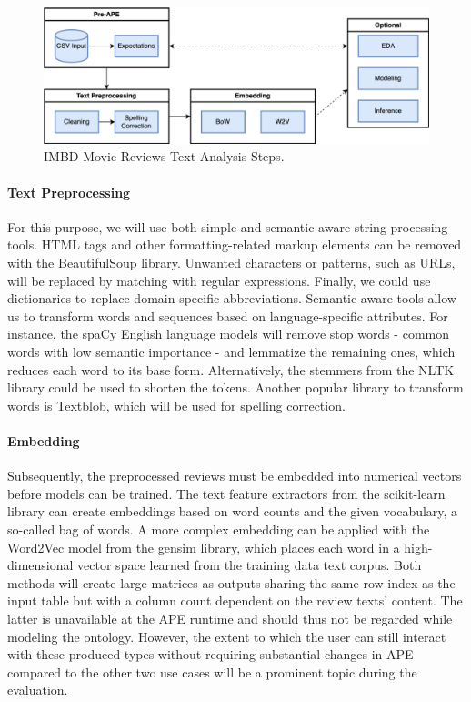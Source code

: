 \begin{figure}
    \centering
    \includegraphics[width=\linewidth]{Tex/images/IMBD.png}
    \caption{IMBD Movie Reviews Text Analysis Steps.}
    \label{fig:usecase_imbd}
\end{figure}

\paragraph{Text Preprocessing}
For this purpose, we will use both simple and semantic-aware string processing tools. HTML tags and other formatting-related markup elements can be removed with the BeautifulSoup library. Unwanted characters or patterns, such as URLs, will be replaced by matching with regular expressions. Finally, we could use dictionaries to replace domain-specific abbreviations. Semantic-aware tools allow us to transform words and sequences based on language-specific attributes. For instance, the spaCy English language models will remove stop words - common words with low semantic importance - and lemmatize the remaining ones, which reduces each word to its base form. Alternatively, the stemmers from the NLTK library could be used to shorten the tokens. Another popular library to transform words is Textblob, which will be used for spelling correction.

\paragraph{Embedding}
Subsequently, the preprocessed reviews must be embedded into numerical vectors before models can be trained. The text feature extractors from the scikit-learn library can create embeddings based on word counts and the given vocabulary, a so-called bag of words. A more complex embedding can be applied with the Word2Vec model from the gensim library, which places each word in a high-dimensional vector space learned from the training data text corpus. Both methods will create large matrices as outputs sharing the same row index as the input table but with a column count dependent on the review texts’ content. The latter is unavailable at the APE runtime and should thus not be regarded while modeling the ontology. However, the extent to which the user can still interact with these produced types without requiring substantial changes in APE compared to the other two use cases will be a prominent topic during the evaluation.

